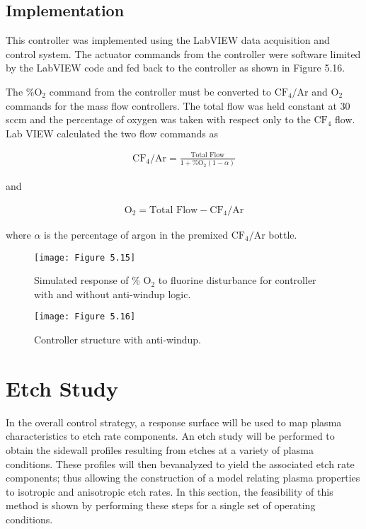 \subsection{Implementation}
\tab This controller was implemented using the LabVIEW data acquisition and control system. The actuator commands from the controller were software limited by the LabVIEW code and fed back to the controller as shown in Figure 5.16.


The \%$\text{O}_{2}$ command from the controller must be converted to $\text{CF}_{4}/\text{Ar}$ and $\text{O}_{2}$ commands for the mass flow controllers. The total flow was held constant at 30 sccm and the percentage of oxygen was taken with respect only to the $\text{CF}_{4}$ flow. Lab VIEW calculated the two flow commands as

\begin{align}
	\text{CF}_{4}/\text{Ar} = \frac{\text{Total Flow}}{1+\text{\% O}_{2}(1-\alpha)}
\end{align}

\noindent and

\begin{align}
	\text{O}_{2} = \text{Total Flow} - \text{CF}_{4}/\text{Ar}
\end{align}

\noindent where $\alpha$ is the percentage of argon in the premixed $\text{CF}_{4}/\text{Ar}$ bottle.

\begin{figure}[H]
	\centering
	\texttt{[image: Figure 5.15]}
	\bf\caption{  Simulated response of \% $\text{O}_{2}$ to fluorine disturbance for controller with and without anti-windup logic.}
	\label{fig:5.15}
\end{figure}

\begin{figure}
	\centering
	\texttt{[image: Figure 5.16]}
	\bf\caption{Controller structure with anti-windup.}
	\label{fig:5.16}
\end{figure}

\section{Etch Study}
\tab In the overall control strategy, a response surface will be used to map plasma characteristics to etch rate components. An etch study will be performed to obtain the sidewall profiles resulting from etches at a variety of plasma conditions. These profiles will then bevanalyzed to yield the associated etch rate components; thus allowing the construction of a model relating plasma properties to isotropic and anisotropic etch rates. In this section, the feasibility of this method is shown by performing these steps for a single set of operating conditions.

